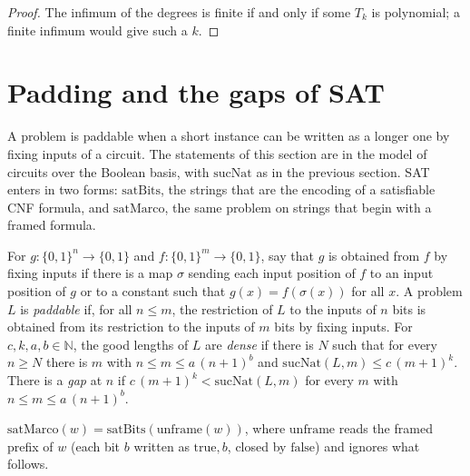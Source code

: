 \begin{proof}
  \leanok
  The infimum of the degrees is finite if and only if some $T_k$ is polynomial; a finite infimum would give such a $k$.
\end{proof}

\section{Padding and the gaps of SAT}
\label{sec:infinite-padding}

A problem is paddable when a short instance can be written as a longer one by fixing inputs of a circuit. The statements
of this section are in the model of circuits over the Boolean basis, with $\mathrm{sucNat}$ as in the previous section.
SAT enters in two forms: $\mathrm{satBits}$, the strings that are the encoding of a satisfiable CNF formula, and
$\mathrm{satMarco}$, the same problem on strings that begin with a framed formula.

\begin{definition}
  \label{def:infinite-rellenable}
  \leanok
  \own{}
  For $g : \{0,1\}^n \to \{0,1\}$ and $f : \{0,1\}^m \to \{0,1\}$, say that $g$ is obtained from $f$ by fixing
  inputs if there is a map $\sigma$ sending each input position of $f$ to an input position of $g$ or to a constant
  such that $g(x) = f(\sigma(x))$ for all $x$. A problem $L$ is \emph{paddable} if, for all $n \le m$, the restriction of
  $L$ to the inputs of $n$ bits is obtained from its restriction to the inputs of $m$ bits by fixing inputs.
  For $c, k, a, b \in \mathbb{N}$, the good lengths of $L$ are \emph{dense} if there is $N$ such that for every $n \ge N$
  there is $m$ with $n \le m \le a\,(n+1)^b$ and $\mathrm{sucNat}(L, m) \le c\,(m+1)^k$. There is a \emph{gap} at $n$ if
  $c\,(m+1)^k < \mathrm{sucNat}(L, m)$ for every $m$ with $n \le m \le a\,(n+1)^b$.
\end{definition}

\begin{definition}
  \label{def:infinite-satmarco}
  \leanok
  \own{}
  $\mathrm{satMarco}(w) = \mathrm{satBits}(\mathrm{unframe}(w))$, where $\mathrm{unframe}$ reads the framed prefix
  of $w$ (each bit $b$ written as $\mathrm{true}, b$, closed by $\mathrm{false}$) and ignores what follows.
\end{definition}

